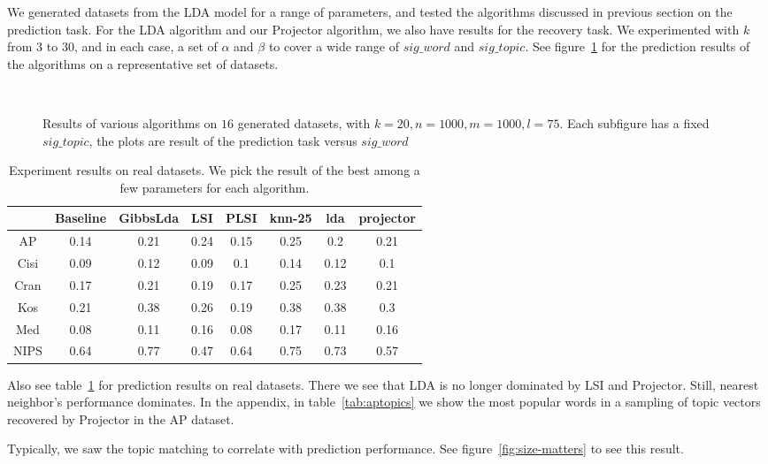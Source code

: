We generated datasets from the LDA model for a range of parameters,
and tested the algorithms discussed in previous section on the
prediction task. For the LDA algorithm and our Projector algorithm, we
also have results for the recovery task. We experimented with $k$ from
$3$ to $30$, and in each case, a set of $\alpha$ and $\beta$ to cover
a wide range of $sig\_word$ and $sig\_topic$. See
figure~\ref{fig:predictResult} for the prediction results of the
algorithms on a representative set of datasets.
\begin{figure}[ht]
     \begin{center}

        \\ 

    \end{center}
    \caption{Results of various algorithms on $16$ generated datasets, with $k=20, n=1000,m=1000,l=75$. Each subfigure has a fixed $sig\_topic$, the plots are result of the prediction task versus $sig\_word$}
   \label{fig:predictResult}
\end{figure}

\begin{table}[ht]
\begin{tabular}{|c|c|c|c|c|c|c|c|}
\hline 
 &Baseline &GibbsLda &LSI &PLSI &knn-25 &lda &projector \\
 \hline 
AP &0.14 &0.21 &0.24 &0.15 &0.25 &0.2 &0.21 \\
 \hline 
Cisi &0.09 &0.12 &0.09 &0.1 &0.14 &0.12 &0.1 \\
 \hline 
Cran &0.17 &0.21 &0.19 &0.17 &0.25 &0.23 &0.21 \\
 \hline 
Kos &0.21 &0.38 &0.26 &0.19 &0.38 &0.38 &0.3 \\
 \hline 
Med &0.08 &0.11 &0.16 &0.08 &0.17 &0.11 &0.16 \\
 \hline 
NIPS &0.64 &0.77 &0.47 &0.64 &0.75 &0.73 &0.57 \\
 \hline 

\end{tabular}
\caption{Experiment results on real datasets. We pick the result of the best among a few parameters for each algorithm. }
\label{tab:real}
\end{table}


Also see table~\ref{tab:real} for prediction results on real datasets.  There we see that
LDA is no longer dominated by LSI and Projector.  Still,  nearest neighbor's performance
dominates.  In the appendix, in table~\ref{tab:aptopics} we show the most popular
words in a sampling of topic vectors recovered by Projector in the AP dataset.

Typically, we saw the topic matching to correlate with prediction performance.
See figure~\ref{fig:size-matters} to see this result. 
